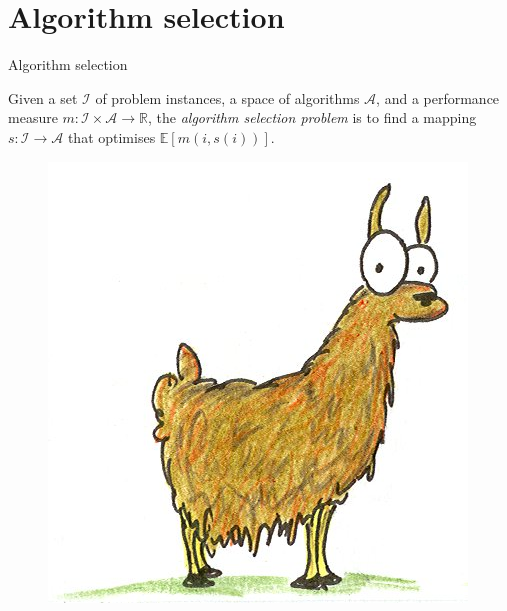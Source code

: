 \documentclass{beamer}
\begin{document}
\section{Algorithm selection}
\begin{frame}{Algorithm selection}
  \begin{definition}
    Given a set $\mathcal{I}$ of problem instances, a space of algorithms
    $\mathcal{A}$, and a performance measure $m \colon \mathcal{I} \times
    \mathcal{A} \to \mathbb{R}$, the \emph{algorithm selection problem} is to
    find a mapping $s \colon \mathcal{I} \to \mathcal{A}$ that optimises
    $\mathbb{E}[m(i, s(i))]$.
  \end{definition}
  \pause
  \begin{figure}
    \centering
    \includegraphics[scale=0.5]{llama.jpg}
  \end{figure}
\end{frame}
\end{document}
